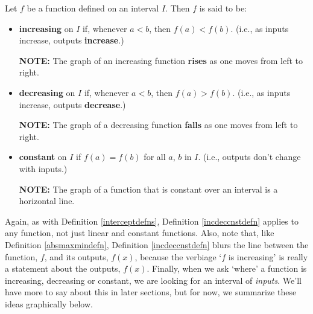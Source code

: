 \colorbox{ResultColor}{\bbm

\begin{defn}

\label{incdeccnstdefn}

Let $f$ be a function defined on an interval $I$.  Then $f$ is said to be:

\begin{itemize}

\item  \textbf{increasing} on $I$ if, whenever $a < b$, then $f(a) < f(b)$.   (i.e., as inputs increase, outputs \textbf{increase}.)

\textbf{NOTE:}  The graph of an increasing function  \textbf{rises} as one moves from left to right.

\item  \textbf{decreasing} on $I$ if, whenever $a < b$, then $f(a) > f(b)$.  (i.e., as inputs increase, outputs \textbf{decrease}.)

\textbf{NOTE:}  The graph of a decreasing function \textbf{falls} as one moves from left to right.

\item  \textbf{constant} on $I$ if $f(a) = f(b)$ for all $a$, $b$ in $I$.  (i.e., outputs don't change with inputs.)

\textbf{NOTE:}  The graph of a function that is constant over an interval is a horizontal line.

\end{itemize}

\end{defn}

\ebm}

\medskip

Again, as with Definition \ref{interceptdefns}, Definition  \ref{incdeccnstdefn} applies to any function, not just linear and constant functions.  Also, note that, like Definition \ref{absmaxmindefn}, Definition \ref{incdeccnstdefn}  blurs the line between the function, $f$, and its outputs, $f(x)$, because the verbiage `$f$ is increasing' is really a statement about the outputs, $f(x)$.  Finally, when we ask `where' a function is increasing, decreasing or constant, we are looking for an interval of \textit{inputs}.  We'll have more to say about this in later sections, but for now, we summarize these ideas graphically below.


